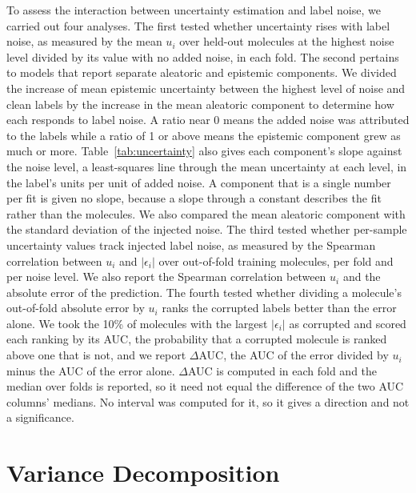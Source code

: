 To assess the interaction between uncertainty estimation and label noise, we carried out four analyses. The first tested whether uncertainty rises with label noise, as measured by the mean $u_i$ over held-out molecules at the highest noise level
divided by its value with no added noise, in each fold. The second pertains to models that report separate aleatoric and epistemic components. We divided the increase of mean epistemic uncertainty between the highest level of noise and clean labels by the increase in the mean aleatoric component to determine how each responds to label noise. A ratio near 0 means the added noise was attributed to the labels while a ratio of 1 or above means the epistemic component grew as much or more. Table~\ref{tab:uncertainty} also gives each component's slope against the noise level, a least-squares line through the mean uncertainty at each level, in the label's units per unit of added noise. A component that is a single number per fit is given no slope, because a slope through a constant describes the fit rather than the molecules. We also compared the mean aleatoric component with the standard deviation of the injected noise. The third tested whether per-sample uncertainty values track injected label noise, as measured by the Spearman correlation between $u_i$ and $|\epsilon_i|$ over out-of-fold training molecules, per fold and per noise level. We also report the Spearman correlation between $u_i$ and the absolute error of the prediction. The fourth tested whether dividing a molecule's out-of-fold absolute error by $u_i$ ranks the corrupted labels better than the error alone. We took the 10\% of molecules with the largest $|\epsilon_i|$ as corrupted and scored each ranking by its AUC, the probability that a corrupted molecule is ranked above one that is not, and we report $\Delta$AUC, the AUC of the error divided by $u_i$ minus the AUC of the error alone. $\Delta$AUC is computed in each fold and the median over folds is reported, so it need not equal the difference of the two AUC columns' medians. No interval was computed for it, so it gives a direction and not a significance.


\section{Variance Decomposition}

